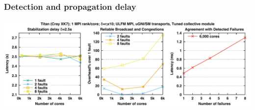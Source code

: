 







\begin{frame}
\frametitle{Detection and propagation delay}
\hspace*{-0.5cm}
\includegraphics[width=1.1\textwidth]{../recva-titan.pdf}
\end{frame}

